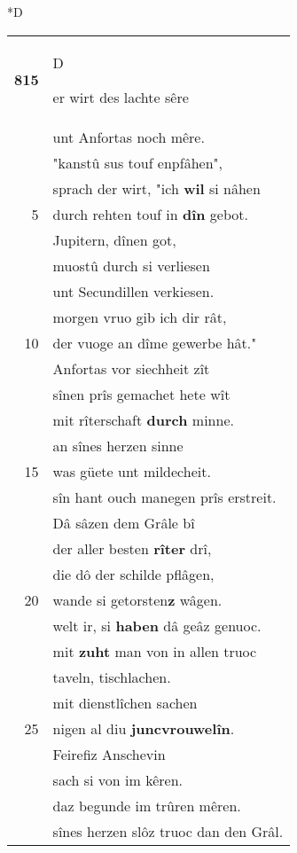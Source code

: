 \documentclass[8pt,a4paper,notitlepage]{article}
\begin{document}
\begin{table}[ht]
\begin{minipage}[t]{0.5\linewidth}
\small
\begin{center}*D
\end{center}
\begin{tabular}{rl}
\textbf{815} & \begin{large}D\end{large}er wirt des lachte sêre\\ 
 & unt Anfortas noch mêre.\\ 
 & "kanstû sus touf enpfâhen",\\ 
 & sprach der wirt, "ich \textbf{wil} si nâhen\\ 
5 & durch rehten touf in \textbf{dîn} gebot.\\ 
 & Jupitern, dînen got,\\ 
 & muostû durch si verliesen\\ 
 & unt Secundillen verkiesen.\\ 
 & morgen vruo gib ich dir rât,\\ 
10 & der vuoge an dîme gewerbe hât."\\ 
 & Anfortas vor siechheit zît\\ 
 & sînen prîs gemachet hete wît\\ 
 & mit rîterschaft \textbf{durch} minne.\\ 
 & an sînes herzen sinne\\ 
15 & was güete unt mildecheit.\\ 
 & sîn hant ouch manegen prîs erstreit.\\ 
 & Dâ sâzen dem Grâle bî\\ 
 & der aller besten \textbf{rîter} drî,\\ 
 & die dô der schilde pflâgen,\\ 
20 & wande si getorsten\textbf{z} wâgen.\\ 
 & welt ir, si \textbf{haben} dâ geâz genuoc.\\ 
 & mit \textbf{zuht} man von in allen truoc\\ 
 & taveln, tischlachen.\\ 
 & mit dienstlîchen sachen\\ 
25 & nigen al diu \textbf{juncvrouwelîn}.\\ 
 & Feirefiz Anschevin\\ 
 & sach si von im kêren.\\ 
 & daz begunde im trûren mêren.\\ 
 & sînes herzen slôz truoc dan den Grâl.\\ 

\end{tabular}
\end{minipage}
\end{table}
\end{document}
